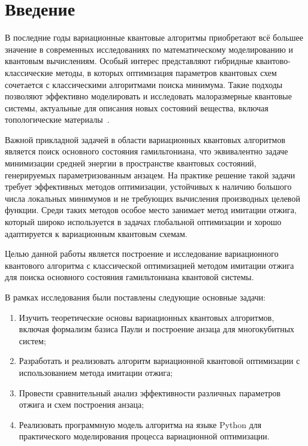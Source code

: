 \documentclass[a4paper]{report}
\begin{document}
\setcounter{page}{2}
\tableofcontents
\newpage

\chapter*{Введение}

В последние годы вариационные квантовые алгоритмы приобретают всё большее значение в современных исследованиях по математическому моделированию и квантовым вычислениям. Особый интерес представляют гибридные квантово-классические методы, в которых оптимизация параметров квантовых схем сочетается с классическими алгоритмами поиска минимума. Такие подходы позволяют эффективно моделировать и исследовать малоразмерные квантовые системы, актуальные для описания новых состояний вещества, включая топологические материалы~\cite{Cerezo2021}.

Важной прикладной задачей в области вариационных квантовых алгоритмов является поиск основного состояния гамильтониана, что эквивалентно задаче минимизации средней энергии в пространстве квантовых состояний, генерируемых параметризованным анзацем. На практике решение такой задачи требует эффективных методов оптимизации, устойчивых к наличию большого числа локальных минимумов и не требующих вычисления производных целевой функции. Среди таких методов особое место занимает метод имитации отжига, который широко используется в задачах глобальной оптимизации и хорошо адаптируется к вариационным квантовым схемам.

Целью данной работы является построение и исследование вариационного квантового алгоритма с классической оптимизацией методом имитации отжига для поиска основного состояния гамильтониана квантовой системы.

В рамках исследования были поставлены следующие основные задачи:
\begin{enumerate}
    \item Изучить теоретические основы вариационных квантовых алгоритмов, включая формализм базиса Паули и построение анзаца для многокубитных систем;
    \item Разработать и реализовать алгоритм вариационной квантовой оптимизации с использованием метода имитации отжига;
    \item Провести сравнительный анализ эффективности различных параметров отжига и схем построения анзаца;
    \item Реализовать программную модель алгоритма на языке Python для практического моделирования процесса вариационной оптимизации.
\end{enumerate}
\end{document}
